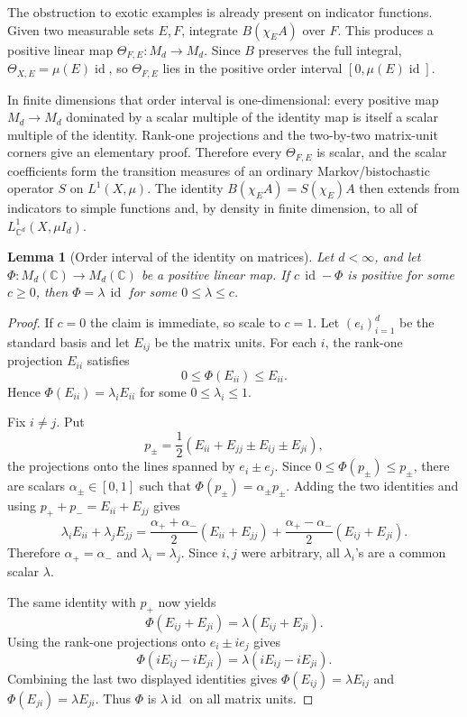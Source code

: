 \documentclass[11pt]{article}
\newtheorem{lemma}{Lemma}
\DeclareMathOperator{\id}{id}
\begin{document}
The obstruction to exotic examples is already present on indicator functions.
Given two measurable sets \(E,F\), integrate \(B(\chi_E A)\) over \(F\).  This
produces a positive linear map \(\Theta_{F,E}:M_d\to M_d\).  Since \(B\)
preserves the full integral, \(\Theta_{X,E}=\mu(E)\id\), so
\(\Theta_{F,E}\) lies in the positive order interval
\([0,\mu(E)\id]\).

In finite dimensions that order interval is one-dimensional: every positive
map \(M_d\to M_d\) dominated by a scalar multiple of the identity map is itself
a scalar multiple of the identity.  Rank-one projections and the two-by-two
matrix-unit corners give an elementary proof.  Therefore every
\(\Theta_{F,E}\) is scalar, and the scalar coefficients form the transition
measures of an ordinary Markov/bistochastic operator \(S\) on \(L^1(X,\mu)\).
The identity \(B(\chi_E A)=S(\chi_E)A\) then extends from indicators to simple
functions and, by density in finite dimension, to all of
\(L^1_{\mathbb C^d}(X,\mu I_d)\).

\begin{lemma}[Order interval of the identity on matrices]\label{lem:order}
Let \(d<\infty\), and let \(\Phi:M_d(\mathbb C)\to M_d(\mathbb C)\) be a
positive linear map.  If \(c\,\id-\Phi\) is positive for some \(c\geq 0\), then
\(\Phi=\lambda\,\id\) for some \(0\leq \lambda\leq c\).
\end{lemma}

\begin{proof}
If \(c=0\) the claim is immediate, so scale to \(c=1\).  Let
\((e_i)_{i=1}^d\) be the standard basis and let \(E_{ij}\) be the matrix units.
For each \(i\), the rank-one projection \(E_{ii}\) satisfies
\[
        0\leq \Phi(E_{ii})\leq E_{ii}.
\]
Hence \(\Phi(E_{ii})=\lambda_iE_{ii}\) for some \(0\leq\lambda_i\leq 1\).

Fix \(i\neq j\).  Put
\[
 p_{\pm}=\frac12(E_{ii}+E_{jj}\pm E_{ij}\pm E_{ji}),
\]
the projections onto the lines spanned by \(e_i\pm e_j\).  Since
\(0\leq\Phi(p_{\pm})\leq p_{\pm}\), there are scalars
\(\alpha_{\pm}\in[0,1]\) such that \(\Phi(p_{\pm})=\alpha_{\pm}p_{\pm}\).
Adding the two identities and using \(p_++p_-=E_{ii}+E_{jj}\) gives
\[
 \lambda_iE_{ii}+\lambda_jE_{jj}
 =
 \frac{\alpha_++\alpha_-}{2}(E_{ii}+E_{jj})
 +\frac{\alpha_+-\alpha_-}{2}(E_{ij}+E_{ji}).
\]
Therefore \(\alpha_+=\alpha_-\) and \(\lambda_i=\lambda_j\).  Since \(i,j\)
were arbitrary, all \(\lambda_i\)'s are a common scalar \(\lambda\).

The same identity with \(p_+\) now yields
\[
        \Phi(E_{ij}+E_{ji})=\lambda(E_{ij}+E_{ji}).
\]
Using the rank-one projections onto \(e_i\pm i e_j\) gives
\[
        \Phi(iE_{ij}-iE_{ji})=\lambda(iE_{ij}-iE_{ji}).
\]
Combining the last two displayed identities gives
\(\Phi(E_{ij})=\lambda E_{ij}\) and \(\Phi(E_{ji})=\lambda E_{ji}\).  Thus
\(\Phi\) is \(\lambda\id\) on all matrix units.
\end{proof}
\end{document}
